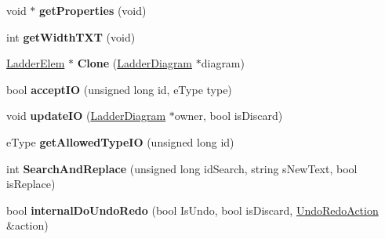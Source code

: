 \begin{DoxyCompactItemize}
\item 
\hypertarget{class_ladder_elem_set_p_w_m_a14bd0381707847f3dcce8b7aefae72d6}{void $\ast$ {\bfseries get\-Properties} (void)}\label{class_ladder_elem_set_p_w_m_a14bd0381707847f3dcce8b7aefae72d6}

\item 
\hypertarget{class_ladder_elem_set_p_w_m_a7ff1e95ce7fffc10cf635fef5767954c}{int {\bfseries get\-Width\-T\-X\-T} (void)}\label{class_ladder_elem_set_p_w_m_a7ff1e95ce7fffc10cf635fef5767954c}

\item 
\hypertarget{class_ladder_elem_set_p_w_m_a07ce2f8eb4baefb5115ee4d60d8cbfaa}{\hyperlink{class_ladder_elem}{Ladder\-Elem} $\ast$ {\bfseries Clone} (\hyperlink{class_ladder_diagram}{Ladder\-Diagram} $\ast$diagram)}\label{class_ladder_elem_set_p_w_m_a07ce2f8eb4baefb5115ee4d60d8cbfaa}

\item 
\hypertarget{class_ladder_elem_set_p_w_m_abd0b71e930162e0a1b784ee3fd37b25f}{bool {\bfseries accept\-I\-O} (unsigned long id, e\-Type type)}\label{class_ladder_elem_set_p_w_m_abd0b71e930162e0a1b784ee3fd37b25f}

\item 
\hypertarget{class_ladder_elem_set_p_w_m_a43ab15cded07eeeb4418324ca4211470}{void {\bfseries update\-I\-O} (\hyperlink{class_ladder_diagram}{Ladder\-Diagram} $\ast$owner, bool is\-Discard)}\label{class_ladder_elem_set_p_w_m_a43ab15cded07eeeb4418324ca4211470}

\item 
\hypertarget{class_ladder_elem_set_p_w_m_a8d9670c478ce8f6c2eb6c4924bc79b00}{e\-Type {\bfseries get\-Allowed\-Type\-I\-O} (unsigned long id)}\label{class_ladder_elem_set_p_w_m_a8d9670c478ce8f6c2eb6c4924bc79b00}

\item 
\hypertarget{class_ladder_elem_set_p_w_m_ab51f897c023d60ed93c731c68e009fed}{int {\bfseries Search\-And\-Replace} (unsigned long id\-Search, string s\-New\-Text, bool is\-Replace)}\label{class_ladder_elem_set_p_w_m_ab51f897c023d60ed93c731c68e009fed}

\item 
\hypertarget{class_ladder_elem_set_p_w_m_a31fa8321cf9dfad700d03b3a7671ae8d}{bool {\bfseries internal\-Do\-Undo\-Redo} (bool Is\-Undo, bool is\-Discard, \hyperlink{struct_undo_redo_action}{Undo\-Redo\-Action} \&action)}\label{class_ladder_elem_set_p_w_m_a31fa8321cf9dfad700d03b3a7671ae8d}

\end{DoxyCompactItemize}
